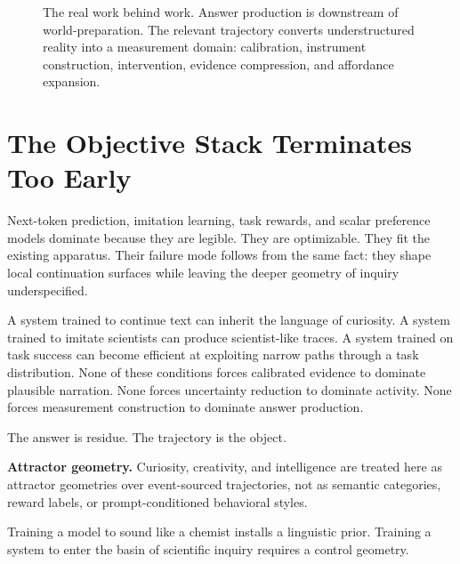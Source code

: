 \documentclass[11pt]{article}
\begin{document}
\begin{figure}[H]
{}
\caption{The real work behind work. Answer production is downstream of world-preparation. The relevant trajectory converts understructured reality into a measurement domain: calibration, instrument construction, intervention, evidence compression, and affordance expansion.}
\label{fig:real-work}
\end{figure}

\section{The Objective Stack Terminates Too Early}

Next-token prediction, imitation learning, task rewards, and scalar preference models dominate because they are legible. They are optimizable. They fit the existing apparatus. Their failure mode follows from the same fact: they shape local continuation surfaces while leaving the deeper geometry of inquiry underspecified.

A system trained to continue text can inherit the language of curiosity. A system trained to imitate scientists can produce scientist-like traces. A system trained on task success can become efficient at exploiting narrow paths through a task distribution. None of these conditions forces calibrated evidence to dominate plausible narration. None forces uncertainty reduction to dominate activity. None forces measurement construction to dominate answer production.

The answer is residue. The trajectory is the object.

\begin{claimbox}
\textbf{Attractor geometry.} Curiosity, creativity, and intelligence are treated here as attractor geometries over event-sourced trajectories, not as semantic categories, reward labels, or prompt-conditioned behavioral styles.
\end{claimbox}

Training a model to sound like a chemist installs a linguistic prior. Training a system to enter the basin of scientific inquiry requires a control geometry.
\end{document}
